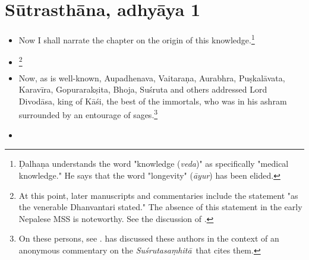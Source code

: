 \documentclass[12pt]{article}
\renewcommand{\SS}{\emph{Suśrutasaṃhitā}}
\newcommand{\saneng}[2]{#2 (\emph{#1})}
\newcommand{\ssaneng}[2]{\relax }
\begin{document}
    \section{Sūtrasthāna, adhyāya 1}
\begin{itemize}
    \item [1]
    Now I shall narrate the chapter on the origin of this knowledge.\footnote{Ḍalhaṇa 
    understands the word "\saneng{veda}{knowledge}" as specifically "medical knowledge."  
    He says that the word "longevity" (\emph{āyur}) \ssaneng{āyur}{life, longevity}
     has been elided.}
    
%    
    
    \item[2]\footnote{At this point, later manuscripts and commentaries include the 
    statement "as the venerable Dhanvantari stated."  The absence of this statement in the 
    early Nepalese MSS is noteworthy. See the discussion of \cite{kleb-2021b}.}
    
    \item[3] Now, as is well-known, Aupadhenava, Vaitaraṇa, Aurabhra, Puṣkalāvata,
Karavīra, Gopurarakṣita, Bhoja, Suśruta and others addressed Lord Divodāsa,
king of Kāśi, the best of the immortals, who was in his ashram surrounded by
an entourage of sages.\footnote{On these persons, see \cite[IA
369\,ff.]{meul-hist}. \citet{kleb-2021a} has discussed these authors in the
context of an anonymous commentary on the \SS\ that cites them.}

\nocite{emen-1969}
    
    
    \item[4]


\end{itemize}
\end{document}
